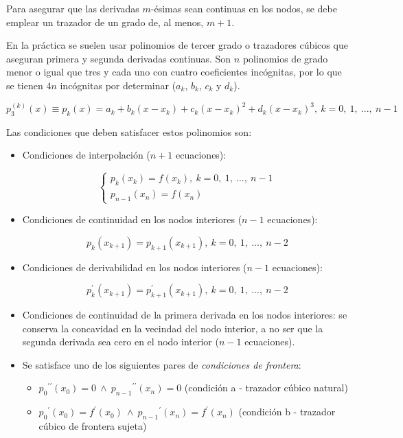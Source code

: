 \documentclass{article}
\begin{document}
Para asegurar que las derivadas $m$-ésimas sean continuas en los nodos, se debe
emplear un trazador de un grado de, al menos, $m+1$.

En la práctica se suelen usar polinomios de tercer grado o trazadores cúbicos 
que aseguran primera y segunda derivadas continuas. Son $n$ polinomios de grado
menor o igual que tres y cada uno con cuatro coeficientes incógnitas, por lo que
se tienen $4n$ incógnitas por determinar ($a_k$, $b_k$, $c_k$ y $d_k$).

\[
p_3^{(k)}(x) \equiv p_k(x) = a_k + b_k(x-x_k) + c_k(x-x_k)^2 + d_k(x-x_k)^3,\ 
k = 0,\ 1,\ ...,\ n-1
\]

Las condiciones que deben satisfacer estos polinomios son:

\begin{itemize}
    \item Condiciones de interpolación ($n+1$ ecuaciones):

    \begin{equation*}
        \begin{cases}
            p_k(x_k) = f(x_k),\ k = 0,\ 1,\ ...,\ n-1 \\
            p_{n-1}(x_n) = f(x_n)
        \end{cases}
    \end{equation*}

    \item Condiciones de continuidad en los nodos interiores ($n-1$ ecuaciones):

    \[ p_k(x_{k+1}) = p_{k+1}(x_{k+1}),\ k = 0,\ 1,\ ...,\ n-2 \]

    \item Condiciones de derivabilidad en los nodos interiores ($n-1$ ecuaciones):

    \[ p_k^\prime(x_{k+1}) = p_{k+1}^\prime(x_{k+1}),\ k = 0,\ 1,\ ...,\ n-2 \]

    \item Condiciones de continuidad de la primera derivada en los nodos 
    interiores: se conserva la concavidad en la vecindad del nodo interior, a no
    ser que la segunda derivada sea cero en el nodo interior ($n-1$ ecuaciones).

    \item Se satisface uno de los siguientes pares de \emph{condiciones de 
    frontera}:

    \begin{itemize}
        \item 
        ${p_0}^{\prime\prime}(x_0) = 0\ \land\ {p_{n-1}}^{\prime\prime}(x_n) = 0$
        (condición a - trazador cúbico natural)

        \item 
        ${p_0}^\prime(x_0) = f^\prime(x_0)\ \land\ {p_{n-1}}^\prime(x_n) = f^\prime(x_n)$
        (condición b - trazador cúbico de frontera sujeta)
    \end{itemize}
\end{itemize}
\end{document}
